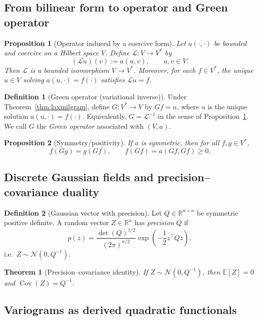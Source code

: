 \documentclass[11pt]{article}
\theoremstyle{definition}
\newtheorem{definition}{Definition}[section]
\theoremstyle{plain}
\newtheorem{theorem}{Theorem}[section]
\newtheorem{proposition}{Proposition}[section]
\theoremstyle{remark}
\newcommand{\R}{\mathbb{R}}
\DeclareMathOperator{\Cov}{Cov}
\begin{document}
\subsection{From bilinear form to operator and Green operator}

\begin{proposition}[Operator induced by a coercive form]\label{prop:form-operator}
Let $a(\cdot,\cdot)$ be bounded and coercive on a Hilbert space $V$.
Define $\mathcal{L}:V\to V^\ast$ by
\[
(\mathcal{L}u)(v) := a(u,v),\qquad u,v\in V.
\]
Then $\mathcal{L}$ is a bounded isomorphism $V\to V^\ast$. Moreover, for each $f\in V^\ast$,
the unique $u\in V$ solving $a(u,\cdot)=f(\cdot)$ satisfies $\mathcal{L}u=f$.
\end{proposition}

\begin{definition}[Green operator (variational inverse)]\label{def:green}
Under Theorem~\ref{thm:laxmilgram}, define $G:V^\ast\to V$ by $Gf=u$, where $u$ is the unique solution
$a(u,\cdot)=f(\cdot)$. Equivalently, $G=\mathcal{L}^{-1}$ in the sense of Proposition~\ref{prop:form-operator}.
We call $G$ the \emph{Green operator} associated with $(V,a)$.
\end{definition}

\begin{proposition}[Symmetry/positivity]\label{prop:greensym}
If $a$ is symmetric, then for all $f,g\in V^\ast$,
\[
f(Gg)=g(Gf),\qquad f(Gf)=a(Gf,Gf)\ge 0.
\]
\end{proposition}

\subsection{Discrete Gaussian fields and precision--covariance duality}

\begin{definition}[Gaussian vector with precision]\label{def:prec}
Let $Q\in\R^{n\times n}$ be symmetric positive definite.
A random vector $Z\in\R^n$ has \emph{precision} $Q$ if
\[
p(z)=\frac{\det(Q)^{1/2}}{(2\pi)^{n/2}}\exp\!\left(-\frac12 z^\top Q z\right),
\]
i.e.\ $Z\sim\mathcal{N}(0,Q^{-1})$.
\end{definition}

\begin{theorem}[Precision--covariance identity]\label{thm:preccov}
If $Z\sim\mathcal{N}(0,Q^{-1})$, then $\mathbb{E}[Z]=0$ and $\Cov(Z)=Q^{-1}$.
\end{theorem}

\subsection{Variograms as derived quadratic functionals}
\end{document}
